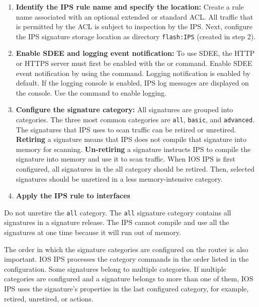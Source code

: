 \begin{enumerate}
\item \textbf{Identify the IPS rule name and specify the location:} Create a rule name associated with an optional extended or standard ACL. All traffic that is permitted by the ACL is subject to inspection by the IPS. Next, configure the IPS signature storage location as directory \verb|flash:IPS| (created in step 2).

\item \textbf{Enable SDEE and logging event notification:} To use SDEE, the HTTP or HTTPS server must first be enabled with the  or  command. Enable SDEE event notification by using the  command. Logging notification is enabled by default. If the logging console is enabled, IPS log messages are displayed on the console. Use the  command to enable logging.

\item \textbf{Configure the signature category:} All signatures are grouped into categories. The three most common categories are \verb|all|, \verb|basic|, and \verb|advanced|. The signatures that IPS uses to scan traffic can be retired or unretired. \textbf{Retiring} a signature means that IPS does not compile that signature into memory for scanning. \textbf{Un-retiring} a signature instructs IPS to compile the signature into memory and use it to scan traffic. When IOS IPS is first configured, all signatures in the all category should be retired. Then, selected signatures should be unretired in a less memory-intensive category. 

\item \textbf{Apply the IPS rule to interfaces} 
\end{enumerate}

\note Do not unretire the \verb|all| category. The \verb|all| signature category contains all signatures in a signature release. The IPS cannot compile and use all the signatures at one time because it will run out of memory.

\note The order in which the signature categories are configured on the router is also important. IOS IPS processes the category commands in the order listed in the configuration. Some signatures belong to multiple categories. If multiple categories are configured and a signature belongs to more than one of them, IOS IPS uses the signature’s properties in the last configured category, for example, retired, unretired, or actions.


